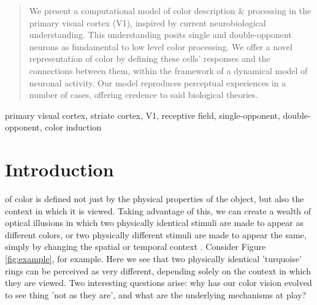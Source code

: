 \documentclass[journal,onecolumn]{IEEEtran}
\begin{document}
\begin{abstract}
We present a computational model of color description \& processing in the primary visual cortex (V1), inspired by current neurobiological understanding. This understanding posits single and double-opponent neurons as fundamental to low level color processing. We offer a novel representation of color by defining these cells' responses and the connections between them, within the framework of a dynamical model of neuronal activity. Our model reproduces perceptual experiences in a number of cases, offering credence to said biological theories.
\end{abstract}

\begin{IEEEkeywords}
primary visual cortex, striate cortex, V1, receptive field, single-opponent, double-opponent, color induction
\end{IEEEkeywords}


%
\IEEEpeerreviewmaketitle


\section{Introduction}

 of color is defined not just by the physical properties of the object, but also the context in which it is viewed. Taking advantage of this, we can create a wealth of optical illusions in which two physically identical stimuli are made to appear as different colors, or two physically different stimuli are made to appear the same, simply by changing the spatial or temporal context \cite{conway:2010}. Consider Figure \ref{fig:example}, for example. Here we see that two physically identical 'turquoise' rings can be perceived as very different, depending solely on the context in which they are viewed. Two interesting questions arise: why has our color vision evolved to see thing 'not as they are', and what are the underlying mechanisms at play?
\end{document}
